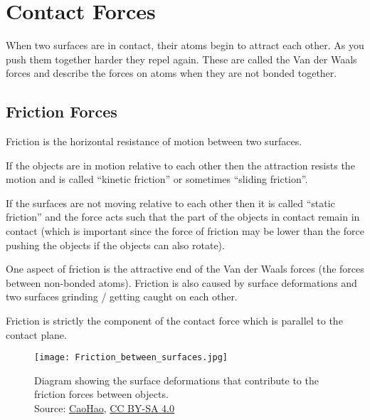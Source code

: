 \documentclass[main.tex]{subfiles}
\begin{document}
            \newpage
            \section{Contact Forces}
                \label{sec: Contact Forces}

                When two surfaces are in contact, their atoms begin to attract each other. As you push them together harder they repel again. These are called the Van der Waals forces and describe the forces on atoms when they are not bonded together.

                \subsection{Friction Forces}
                    \label{subsec: Friction Forces}

                    Friction is the horizontal resistance of motion between two surfaces. 
                    
                    If the objects are in motion relative to each other then the attraction resists the motion and is called ``kinetic friction'' or sometimes ``sliding friction''. 
                    
                    If the surfaces are not moving relative to each other then it is called ``static friction'' and the force acts such that the part of the objects in contact remain in contact (which is important since the force of friction may be lower than the force pushing the objects if the objects can also rotate).

                    One aspect of friction is the attractive end of the Van der Waals forces (the forces between non-bonded atoms). Friction is also caused by surface deformations and two surfaces grinding / getting caught on each other. 

                    Friction is strictly the component of the contact force which is parallel to the contact plane.


                    \begin{figure}[!h]
                        \centering
                        \begin{adjustbox}{clip,trim=0mm 8mm 30mm 0mm}
                            \texttt{[image: Friction\_between\_surfaces.jpg]}
                        \end{adjustbox}
                        

                        \caption{Diagram showing the surface deformations that contribute to the friction forces between objects.\\Source: \href{https://commons.wikimedia.org/wiki/File:Friction_between_surfaces.jpg}{CaoHao}, \href{https://creativecommons.org/licenses/by-sa/4.0/deed.en}{CC BY-SA 4.0}}
                        \label{fig: Friction surface smoothness diagram}
                    \end{figure}
\end{document}
